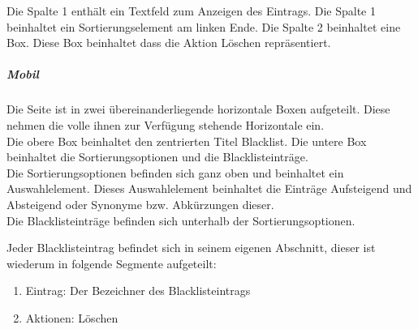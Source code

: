 Die Spalte 1 enthält ein Textfeld zum Anzeigen des Eintrags.
Die Spalte 1 beinhaltet ein Sortierungselement am linken Ende.
Die Spalte 2 beinhaltet eine Box. Diese Box beinhaltet dass die Aktion \dq Löschen \dq{} repräsentiert.

\begin{center}
    \captionsetup[figure]{labelformat=empty}
    \captionsetup[figure]{labelformat=default}
\end{center}

\vspace{0.5em}
\begin{minipage}{\textwidth}
    \begin{minipage}{.5\textwidth}
        \subparagraph*{Mobil}
        Die Seite ist in zwei übereinanderliegende horizontale Boxen aufgeteilt. Diese nehmen die volle ihnen zur Verfügung stehende Horizontale ein.\\
        Die obere Box beinhaltet den zentrierten Titel \dq Blacklist\dq.
        Die untere Box beinhaltet die Sortierungsoptionen und die Blacklisteinträge.\\
        Die Sortierungsoptionen befinden sich ganz oben und beinhaltet ein Auswahlelement. 
        Dieses Auswahlelement beinhaltet die Einträge \dq Aufsteigend \dq{} und \dq Absteigend \dq{} oder Synonyme bzw. Abkürzungen dieser.\\
        Die Blacklisteinträge befinden sich unterhalb der Sortierungsoptionen.
    \end{minipage}
    \begin{minipage}{.5\textwidth}
        \hspace{.2\textwidth}
        \captionsetup[figure]{labelformat=empty}
        \captionsetup[figure]{labelformat=default}    
    \end{minipage}
\end{minipage}
\vspace{0.5em}

Jeder Blacklisteintrag befindet sich in seinem eigenen Abschnitt, dieser ist wiederum in folgende Segmente aufgeteilt:

\begin{enumerate}
    \item Eintrag: Der Bezeichner des Blacklisteintrags
    \item Aktionen: Löschen
\end{enumerate}

